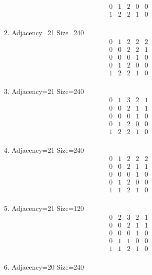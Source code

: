 \documentclass[12pt]{article}
\begin{document}
\begin{multicols}{3}
\begin{enumerate}
\begin{equation*}
\begin{array}{ccccc}
0&1&2&0&0\\
1&2&2&1&0\\
\end{array}
\end{equation*}
\item Adjacency=21 Size=240
\begin{equation*}
\begin{array}{ccccc}
0&1&2&2&2\\
0&0&2&2&1\\
0&0&0&1&0\\
0&1&2&0&0\\
1&2&2&1&0\\
\end{array}
\end{equation*}
\item Adjacency=21 Size=240
\begin{equation*}
\begin{array}{ccccc}
0&1&3&2&1\\
0&0&2&1&1\\
0&0&0&1&0\\
0&1&2&0&0\\
1&2&2&1&0\\
\end{array}
\end{equation*}
\item Adjacency=21 Size=240
\begin{equation*}
\begin{array}{ccccc}
0&1&2&2&2\\
0&0&2&1&1\\
0&0&0&1&0\\
0&1&2&0&0\\
1&1&2&1&0\\
\end{array}
\end{equation*}
\item Adjacency=21 Size=120
\begin{equation*}
\begin{array}{ccccc}
0&2&3&2&1\\
0&0&2&1&1\\
0&0&0&1&0\\
0&1&1&0&0\\
1&1&2&1&0\\
\end{array}
\end{equation*}
\item Adjacency=20 Size=240
\begin{equation*}
\begin{array}{ccccc}

\end{array}
\end{equation*}
\end{enumerate}
\end{multicols}
\end{document}
